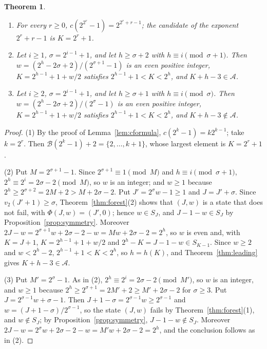 \documentclass[11pt]{amsart}
\newtheorem{Theorem}{Theorem}[section]
\theoremstyle{definition}
\begin{document}
\begin{Theorem}
\label{thm:symfamilies}
\begin{enumerate}
\item For every $r\ge0$, $c(2^{2^r}-1)=2^{2^r+r-1}$; the candidate of the exponent $2^r+r-1$ is $K=2^r+1$.
\item Let $i\ge1$, $\sigma=2^{i-1}+1$, and let $h\ge\sigma+2$ with $h\equiv i\pmod{\sigma+1}$. Then $w=(2^h-2\sigma+2)/(2^{\sigma+1}-1)$ is an even positive integer, $K=2^{h-1}+1+w/2$ satisfies $2^{h-1}+1<K<2^h$, and $K+h-3\in\mathcal{A}$.
\item Let $i\ge2$, $\sigma=2^{i-1}+1$, and let $h\ge\sigma+1$ with $h\equiv i\pmod{\sigma}$. Then $w=(2^h-2\sigma+2)/(2^{\sigma}-1)$ is an even positive integer, $K=2^{h-1}+1+w/2$ satisfies $2^{h-1}+1<K<2^h$, and $K+h-3\notin\mathcal{A}$.
\end{enumerate}
\end{Theorem}
\begin{proof}
(1) By the proof of Lemma~\ref{lem:cformula}, $c(2^k-1)=k2^{k-1}$; take $k=2^r$. Then $\mathcal{B}(2^k-1)+2=\{2,\dots,k+1\}$, whose largest element is $K=2^r+1$.

(2) Put $M=2^{\sigma+1}-1$. Since $2^{\sigma+1}\equiv1\pmod M$ and $h\equiv i\pmod{\sigma+1}$, $2^h\equiv2^i=2\sigma-2\pmod M$, so $w$ is an integer; and $w\ge1$ because $2^h\ge2^{\sigma+2}=2M+2>M+2\sigma-2$. Put $J'=2^\sigma w-1\ge1$ and $J=J'+\sigma$. Since $v_2(J'+1)\ge\sigma$, Theorem~\ref{thm:forest}(2) shows that $(J,w)$ is a state that does not fail, with $\Phi(J,w)=(J',0)$; hence $w\in S_J$, and $J-1-w\in S_J$ by Proposition~\ref{prop:symmetry}. Moreover $2J-w=2^{\sigma+1}w+2\sigma-2-w=Mw+2\sigma-2=2^h$, so $w$ is even and, with $K=J+1$, $K=2^{h-1}+1+w/2$ and $2^h-K=J-1-w\in S_{K-1}$. Since $w\ge2$ and $w<2^h-2$, $2^{h-1}+1<K<2^h$, so $h=h(K)$, and Theorem~\ref{thm:leading} gives $K+h-3\in\mathcal{A}$.

(3) Put $M'=2^{\sigma}-1$. As in (2), $2^h\equiv2^i=2\sigma-2\pmod{M'}$, so $w$ is an integer, and $w\ge1$ because $2^h\ge2^{\sigma+1}=2M'+2\ge M'+2\sigma-2$ for $\sigma\ge3$. Put $J=2^{\sigma-1}w+\sigma-1$. Then $J+1-\sigma=2^{\sigma-1}w\ge2^{\sigma-1}$ and $w=(J+1-\sigma)/2^{\sigma-1}$, so the state $(J,w)$ fails by Theorem~\ref{thm:forest}(1), and $w\notin S_J$; by Proposition~\ref{prop:symmetry}, $J-1-w\notin S_J$. Moreover $2J-w=2^\sigma w+2\sigma-2-w=M'w+2\sigma-2=2^h$, and the conclusion follows as in (2).
\end{proof}
\end{document}
